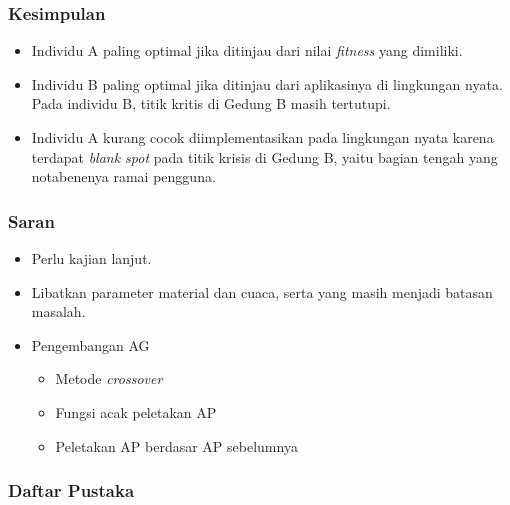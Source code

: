 \documentclass[12pt]{beamer}
\begin{document}
	\begin{frame}
		\frametitle{Kesimpulan}
		\begin{itemize}
			\item Individu A paling optimal jika ditinjau dari nilai \emph{fitness} yang dimiliki.
			\item Individu B paling optimal jika ditinjau dari aplikasinya di lingkungan nyata. Pada individu B, titik kritis di Gedung B masih tertutupi.
			\item Individu A kurang cocok diimplementasikan pada lingkungan nyata karena terdapat \emph{blank spot} pada titik krisis di Gedung B, yaitu bagian tengah yang notabenenya ramai pengguna.
		\end{itemize}
	\end{frame}
	
	\begin{frame}
		\frametitle{Saran}
		\begin{itemize}
			\item Perlu kajian lanjut.
			\item Libatkan parameter material dan cuaca, serta yang masih menjadi batasan masalah.
			\item Pengembangan AG
				\begin{itemize}
					\item Metode \emph{crossover}
					\item Fungsi acak peletakan AP
					\item Peletakan AP berdasar AP sebelumnya
				\end{itemize}
		\end{itemize}
	\end{frame}
	\begin{frame}
		\frametitle{Daftar Pustaka}
		\nocite{*}
		
		
	\end{frame}
\end{document}
